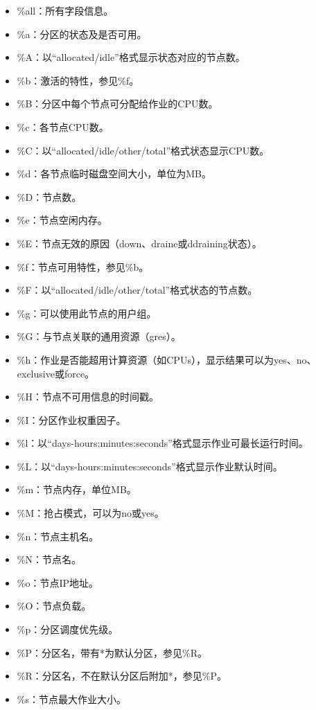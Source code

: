 \begin{itemize}
\begin{itemize}
   	\item \%all：所有字段信息。
   	\item \%a：分区的状态及是否可用。
   	\item \%A：以``allocated/idle''格式显示状态对应的节点数。
   	\item \%b：激活的特性，参见\%f。
   	\item \%B：分区中每个节点可分配给作业的CPU数。
   	\item \%c：各节点CPU数。
   	\item \%C：以``allocated/idle/other/total''格式状态显示CPU数。
   	\item \%d：各节点临时磁盘空间大小，单位为MB。
   	\item \%D：节点数。
   	\item \%e：节点空闲内存。
   	\item \%E：节点无效的原因（down、draine或ddraining状态）。
   	\item \%f：节点可用特性，参见\%b。
   	\item \%F：以``allocated/idle/other/total''格式状态的节点数。
   	\item \%g：可以使用此节点的用户组。
   	\item \%G：与节点关联的通用资源（gres）。
   	\item \%h：作业是否能超用计算资源（如CPUs），显示结果可以为yes、no、exclusive或force。
   	\item \%H：节点不可用信息的时间戳。
   	\item \%I：分区作业权重因子。
   	\item \%l：以``days-hours:minutes:seconds''格式显示作业可最长运行时间。
   	\item \%L：以``days-hours:minutes:seconds''格式显示作业默认时间。
   	\item \%m：节点内存，单位MB。
   	\item \%M：抢占模式，可以为no或yes。
   	\item \%n：节点主机名。
   	\item \%N：节点名。
   	\item \%o：节点IP地址。
   	\item \%O：节点负载。
   	\item \%p：分区调度优先级。
   	\item \%P：分区名，带有*为默认分区，参见\%R。
   	\item \%R：分区名，不在默认分区后附加*，参见\%P。
   	\item \%s：节点最大作业大小。

\end{itemize}
\end{itemize}
